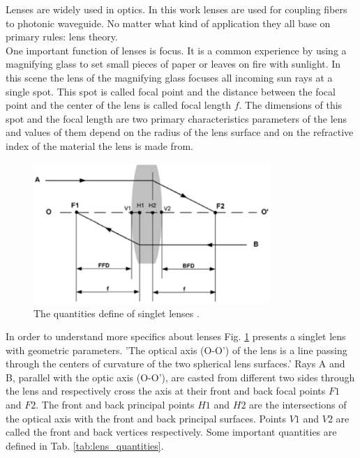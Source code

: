 Lenses are widely used in optics. In this work lenses are used for coupling fibers to photonic waveguide. No matter what kind of application they all base on primary rules: lens theory.\\

One important function of lenses is focus. It is a common experience by using a magnifying glass to set small pieces of paper or leaves on fire with sunlight. In this scene the lens of the magnifying glass focuses all incoming sun rays at a single spot. This spot is called focal point and the distance between the focal point and the center of the lens is called focal length $f$. The dimensions of this spot and the focal length are two primary characteristics parameters of the lens and values of them depend on the radius of the lens surface and on the refractive index of the material the lens is made from. \\

\begin{figure}[!ht]
\centering
\includegraphics[width=0.8\textwidth]{bilder/lens_define}
\caption{The quantities define of singlet lenses \cite{lens_theory_LC_Ltd}.}
\label{fig:lens_define}
\end{figure}
In order to understand more specifics about lenses Fig. \ref{fig:lens_define}  presents a singlet lens with geometric parameters. 'The optical axis (O-O') of the lens is a line passing through the centers of curvature of the two spherical lens surfaces.'  
Rays A and B, parallel with the optic axis (O-O'), are casted from different two sides through the lens and respectively cross the axis at their front and back focal points $F1$ and $F2$. The front and back principal points $H1$ and $H2$ are the intersections of the optical axis with the front and back principal surfaces. Points $V1$ and $V2$ are called the front and back vertices respectively\cite{lens_theory_LC_Ltd}.  Some important quantities are defined in Tab. \ref{tab:lens_quantities}. \\

